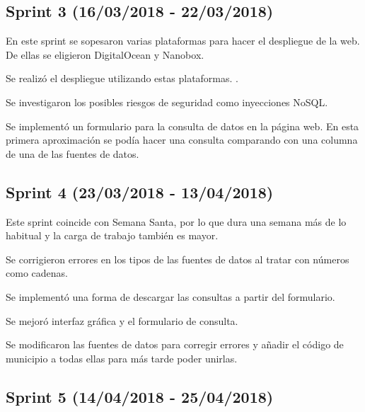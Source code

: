 

\subsection{Sprint 3 (16/03/2018 - 22/03/2018)}

En este sprint se sopesaron varias plataformas para hacer el despliegue de la web. De ellas se eligieron DigitalOcean y Nanobox.

Se realizó el despliegue utilizando estas plataformas. .

Se investigaron los posibles riesgos de seguridad como inyecciones NoSQL.

Se implementó un formulario para la consulta de datos en la página web. En esta primera aproximación se podía hacer una consulta comparando con una columna de una de las fuentes de datos.



\subsection{Sprint 4 (23/03/2018 - 13/04/2018)}

Este sprint coincide con Semana Santa, por lo que dura una semana más de lo habitual y la carga de trabajo también es mayor.

Se corrigieron errores en los tipos de las fuentes de datos al tratar con números como cadenas. 

Se implementó una forma de descargar las consultas a partir del formulario. 

Se mejoró interfaz gráfica y el formulario de consulta.

Se modificaron las fuentes de datos para corregir errores y añadir el código de municipio a todas ellas para más tarde poder unirlas.



\subsection{Sprint 5 (14/04/2018 - 25/04/2018)}

